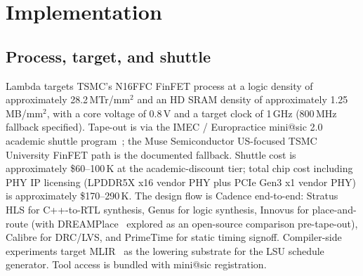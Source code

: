 \documentclass[conference]{IEEEtran}
\begin{document}
\section{Implementation}
\label{sec:implementation}

\subsection{Process, target, and shuttle}

Lambda targets TSMC's N16FFC FinFET process at a logic density of approximately 28.2\,MTr/mm$^2$ and an HD SRAM density of approximately 1.25\,MB/mm$^2$, with a core voltage of 0.8\,V and a target clock of 1\,GHz (800\,MHz fallback specified). Tape-out is via the IMEC / Europractice mini@sic 2.0 academic shuttle program~\cite{imec_minisic}; the Muse Semiconductor US-focused TSMC University FinFET path is the documented fallback. Shuttle cost is approximately \$60--100\,K at the academic-discount tier; total chip cost including PHY IP licensing (LPDDR5X x16 vendor PHY plus PCIe Gen3 x1 vendor PHY) is approximately \$170--290\,K. The design flow is Cadence end-to-end: Stratus HLS for C++-to-RTL synthesis, Genus for logic synthesis, Innovus for place-and-route (with DREAMPlace~\cite{dreamplace} explored as an open-source comparison pre-tape-out), Calibre for DRC/LVS, and PrimeTime for static timing signoff. Compiler-side experiments target MLIR~\cite{mlir} as the lowering substrate for the LSU schedule generator. Tool access is bundled with mini@sic registration.
\end{document}
